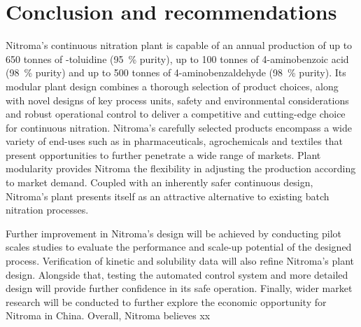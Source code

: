 \section*{Conclusion and recommendations}
Nitroma's continuous nitration plant is capable of an annual production of up to 650 tonnes of \ortho-toluidine (\SI{95}{\percent} purity), up to 100 tonnes of 4-aminobenzoic acid (\SI{98}{\percent} purity) and up to 500 tonnes of 4-aminobenzaldehyde (\SI{98}{\percent} purity). Its modular plant design combines a thorough selection of product choices, along with novel designs of key process units, safety and environmental considerations and robust operational control to deliver a competitive and cutting-edge choice for continuous nitration. Nitroma's carefully selected products encompass a wide variety of end-uses such as in pharmaceuticals, agrochemicals and textiles that present opportunities to further penetrate a wide range of markets. Plant modularity provides Nitroma the flexibility in adjusting the production according to market demand. Coupled with an inherently safer continuous design, Nitroma's plant presents itself as an attractive alternative to existing batch nitration processes.

Further improvement in Nitroma's design will be achieved by conducting pilot scales studies to evaluate the performance and scale-up potential of the designed process. Verification of kinetic and solubility data will also refine Nitroma's plant design. Alongside that, testing the automated control system and more detailed design will provide further confidence in its safe operation. Finally, wider market research will be conducted to further explore the economic opportunity for Nitroma in China. Overall, Nitroma believes xx

